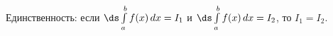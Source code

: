 
 	Единственность: если $\ds\int\limits_a^bf(x)\,dx=I_1$ и $\ds\int\limits_a^bf(x)\,dx=I_2$, то $I_1=I_2$.
 